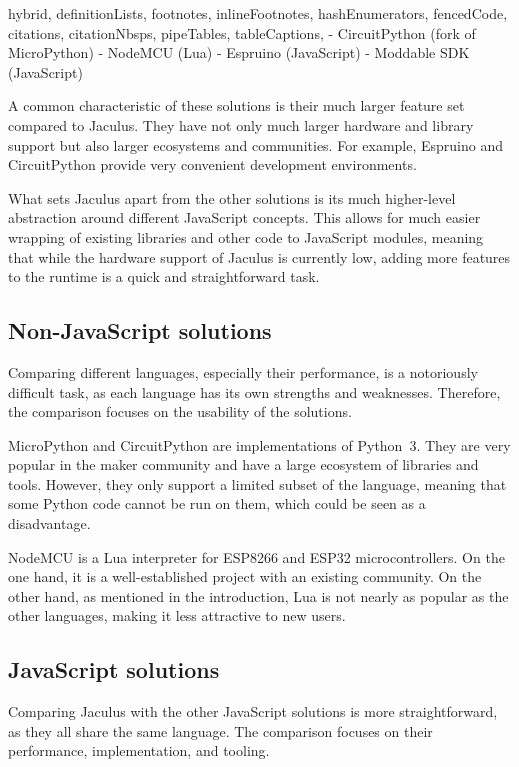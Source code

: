 \begin{markdown*}{%
  hybrid,
  definitionLists,
  footnotes,
  inlineFootnotes,
  hashEnumerators,
  fencedCode,
  citations,
  citationNbsps,
  pipeTables,
  tableCaptions,
}
- CircuitPython\cite{circuitpython} (fork of MicroPython\cite{micropython})
- NodeMCU\cite{nodemcu} (Lua)
- Espruino\cite{espruino} (JavaScript)
- Moddable SDK\cite{moddable} (JavaScript)

A common characteristic of these solutions is their much larger feature set compared to Jaculus. They have not only much larger hardware and library support but also larger ecosystems and communities. For example, Espruino and CircuitPython provide very convenient development environments.

What sets Jaculus apart from the other solutions is its much higher-level abstraction around different JavaScript concepts. This allows for much easier wrapping of existing libraries and other code to JavaScript modules, meaning that while the hardware support of Jaculus is currently low, adding more features to the runtime is a quick and straightforward task.

\subsection{Non-JavaScript solutions}

Comparing different languages, especially their performance, is a notoriously difficult task, as each language has its own strengths and weaknesses. Therefore, the comparison focuses on the usability of the solutions.

MicroPython and CircuitPython are implementations of Python~3. They are very popular in the maker community and have a large ecosystem of libraries and tools. However, they only support a limited subset of the language, meaning that some Python code cannot be run on them, which could be seen as a disadvantage.

NodeMCU is a Lua interpreter for ESP8266 and ESP32 microcontrollers. On the one hand, it is a well-established project with an existing community. On the other hand, as mentioned in the introduction, Lua is not nearly as popular as the other languages, making it less attractive to new users.

\subsection{JavaScript solutions}

Comparing Jaculus with the other JavaScript solutions is more straightforward, as they all share the same language. The comparison focuses on their performance, implementation, and tooling.


\end{markdown*}

